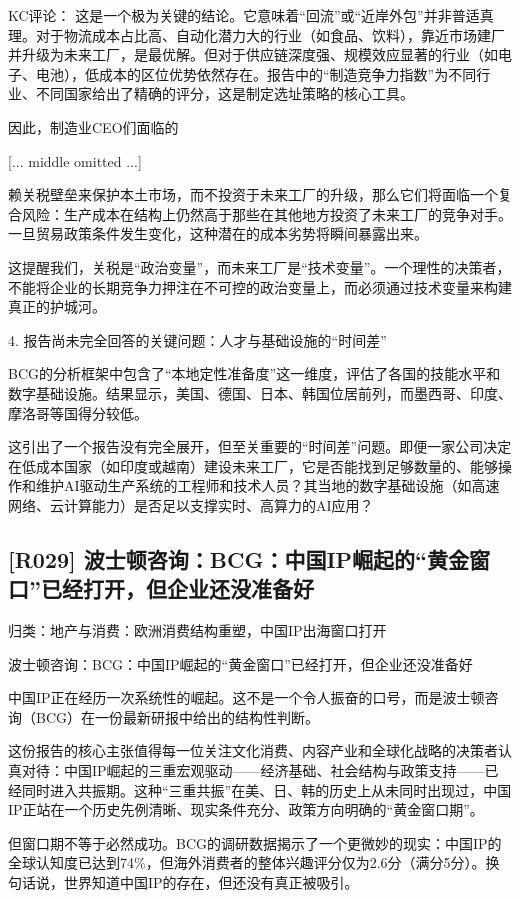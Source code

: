 \documentclass[11pt]{ctexart}
\begin{document}
KC评论： 这是一个极为关键的结论。它意味着“回流”或“近岸外包”并非普适真理。对于物流成本占比高、自动化潜力大的行业（如食品、饮料），靠近市场建厂并升级为未来工厂，是最优解。但对于供应链深度强、规模效应显著的行业（如电子、电池），低成本的区位优势依然存在。报告中的“制造竞争力指数”为不同行业、不同国家给出了精确的评分，这是制定选址策略的核心工具。

因此，制造业CEO们面临的

[... middle omitted ...]

赖关税壁垒来保护本土市场，而不投资于未来工厂的升级，那么它们将面临一个复合风险：生产成本在结构上仍然高于那些在其他地方投资了未来工厂的竞争对手。一旦贸易政策条件发生变化，这种潜在的成本劣势将瞬间暴露出来。

这提醒我们，关税是“政治变量”，而未来工厂是“技术变量”。一个理性的决策者，不能将企业的长期竞争力押注在不可控的政治变量上，而必须通过技术变量来构建真正的护城河。

4. 报告尚未完全回答的关键问题：人才与基础设施的“时间差”

BCG的分析框架中包含了“本地定性准备度”这一维度，评估了各国的技能水平和数字基础设施。结果显示，美国、德国、日本、韩国位居前列，而墨西哥、印度、摩洛哥等国得分较低。

这引出了一个报告没有完全展开，但至关重要的“时间差”问题。即便一家公司决定在低成本国家（如印度或越南）建设未来工厂，它是否能找到足够数量的、能够操作和维护AI驱动生产系统的工程师和技术人员？其当地的数字基础设施（如高速网络、云计算能力）是否足以支撑实时、高算力的AI应用？

\subsection{[R029] 波士顿咨询：BCG：中国IP崛起的“黄金窗口”已经打开，但企业还没准备好}
{\small\color{refgray}归类：地产与消费：欧洲消费结构重塑，中国IP出海窗口打开}

波士顿咨询：BCG：中国IP崛起的“黄金窗口”已经打开，但企业还没准备好

中国IP正在经历一次系统性的崛起。这不是一个令人振奋的口号，而是波士顿咨询（BCG）在一份最新研报中给出的结构性判断。

这份报告的核心主张值得每一位关注文化消费、内容产业和全球化战略的决策者认真对待：中国IP崛起的三重宏观驱动——经济基础、社会结构与政策支持——已经同时进入共振期。这种“三重共振”在美、日、韩的历史上从未同时出现过，中国IP正站在一个历史先例清晰、现实条件充分、政策方向明确的“黄金窗口期”。

但窗口期不等于必然成功。BCG的调研数据揭示了一个更微妙的现实：中国IP的全球认知度已达到74\%，但海外消费者的整体兴趣评分仅为2.6分（满分5分）。换句话说，世界知道中国IP的存在，但还没有真正被吸引。
\end{document}
